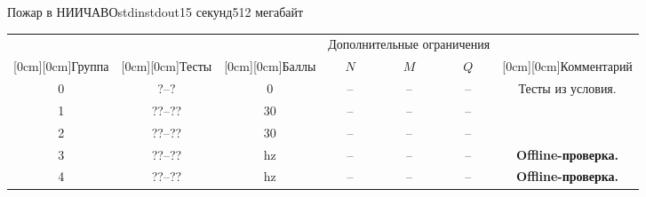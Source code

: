 \begin{problem}{Пожар в НИИЧАВО}{stdin}{stdout}{15 секунд}{512 мегабайт}
\begingroup
\renewcommand{\arraystretch}{1.5}

\begin{tabular}{|c|c|c|c|c|c|c|}
\hline
& & & \multicolumn{3}{c|}{Дополнительные ограничения} & \\
\cline{4-6}
\raisebox{2.25ex}[0cm][0cm]{Группа} & 
\raisebox{2.25ex}[0cm][0cm]{Тесты} &
\raisebox{2.25ex}[0cm][0cm]{Баллы} &
$N$ & $M$ & $Q$ & \raisebox{2.25ex}[0cm][0cm]{Комментарий} \\
\hline
0 & ?--?   & 0  & --            & --            & --              & Тесты из условия. \\
\hline
1 & ??--??  & 30 & --    & --    & --  &                  \\
\hline
2 & ??--?? & 30 & --    & --    & --              &                  \\
\hline
3 & ??--?? & hz & --    & --            & --              & \textbf{Offline-проверка.}                 \\
\hline
4 & ??--?? & hz & --            & --            & --              & \textbf{Offline-проверка.} \\
\hline
\end{tabular}

\endgroup

\end{problem}

